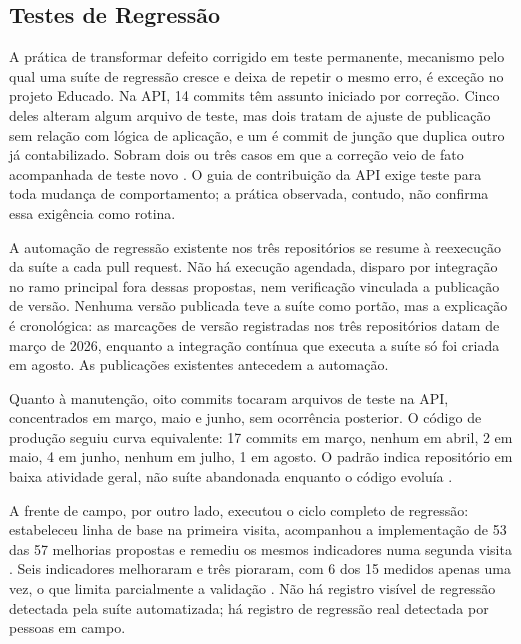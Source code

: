 
\subsection{Testes de Regressão}
\label{sub:regressao}

A prática de transformar defeito corrigido em teste permanente, mecanismo pelo
qual uma suíte de regressão cresce e deixa de repetir o mesmo erro, é exceção no
projeto Educado. Na API, 14 commits têm assunto iniciado por correção. Cinco
deles alteram algum arquivo de teste, mas dois tratam de ajuste de publicação sem
relação com lógica de aplicação, e um é commit de junção que duplica outro já
contabilizado. Sobram dois ou três casos em que a correção veio de fato
acompanhada de teste novo \cite{educado-repos}. O guia de contribuição da API
exige teste para toda mudança de comportamento; a prática observada, contudo, não
confirma essa exigência como rotina.

A automação de regressão existente nos três repositórios se resume à reexecução
da suíte a cada pull request. Não há execução agendada, disparo por
integração no ramo principal fora dessas propostas, nem verificação vinculada a
publicação de versão. Nenhuma versão publicada teve a suíte como portão, mas a
explicação é cronológica: as marcações de versão registradas nos três
repositórios datam de março de 2026, enquanto a integração contínua que executa a
suíte só foi criada em agosto. As publicações existentes antecedem a automação.

Quanto à manutenção, oito commits tocaram arquivos de teste na API, concentrados
em março, maio e junho, sem ocorrência posterior. O código de produção seguiu
curva equivalente: 17 commits em março, nenhum em abril, 2 em maio, 4 em junho,
nenhum em julho, 1 em agosto. O padrão indica repositório em
baixa atividade geral, não suíte abandonada enquanto o código evoluía
\cite{educado-repos}.

A frente de campo, por outro lado, executou o ciclo completo de regressão:
estabeleceu linha de base na primeira visita, acompanhou a implementação de 53
das 57 melhorias propostas e remediu os mesmos indicadores numa segunda visita
\cite[p.~10]{psp5}. Seis indicadores melhoraram e três pioraram, com 6 dos 15
medidos apenas uma vez, o que limita parcialmente a validação
\cite{dashboard}. Não há registro visível de regressão detectada pela suíte
automatizada; há registro de regressão real detectada por pessoas em campo.

